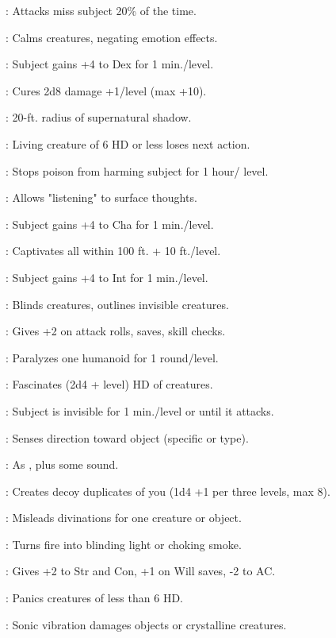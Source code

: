 : Attacks miss subject 20\% of the time.

: Calms creatures, negating emotion effects.

: Subject gains +4 to Dex for 1 min./level.

: Cures 2d8 damage +1/level (max +10).

: 20-ft. radius of supernatural shadow.

: Living creature of 6 HD or less loses next action.

: Stops poison from harming subject for 1 hour/ level.

: Allows "listening" to surface thoughts.

: Subject gains +4 to Cha for 1 min./level.

: Captivates all within 100 ft. + 10 ft./level.

: Subject gains +4 to Int for 1 min./level.

: Blinds creatures, outlines invisible creatures.

: Gives +2 on attack rolls, saves, skill checks.

: Paralyzes one humanoid for 1 round/level.

: Fascinates (2d4 + level) HD of creatures.

: Subject is invisible for 1 min./level or until it attacks.

: Senses direction toward object (specific or type).

: As , plus some sound.

: Creates decoy duplicates of you (1d4 +1 per three levels, max 8).

: Misleads divinations for one creature or object.

: Turns fire into blinding light or choking smoke.

: Gives +2 to Str and Con, +1 on Will saves, -2 to AC.

: Panics creatures of less than 6 HD.

: Sonic vibration damages objects or crystalline creatures.

